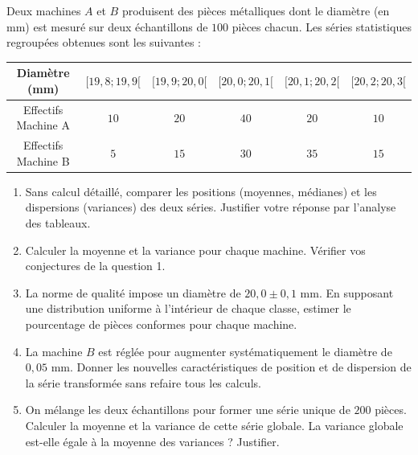 \documentclass[11pt]{article}
\begin{document}
\begin{exercice}
Deux machines $A$ et $B$ produisent des pièces métalliques dont le diamètre (en mm) est mesuré sur deux échantillons de $100$ pièces chacun. Les séries statistiques regroupées obtenues sont les suivantes :

\begin{center}
\begin{tabular}{|c|c|c|c|c|c|}
\hline
Diamètre (mm) & $[19,8; 19,9[$ & $[19,9; 20,0[$ & $[20,0; 20,1[$ & $[20,1; 20,2[$ & $[20,2; 20,3[$ \\
\hline
Effectifs Machine A & $10$ & $20$ & $40$ & $20$ & $10$ \\
\hline
Effectifs Machine B & $5$ & $15$ & $30$ & $35$ & $15$ \\
\hline
\end{tabular}
\end{center}

\begin{enumerate}
    \item Sans calcul détaillé, comparer les positions (moyennes, médianes) et les dispersions (variances) des deux séries. Justifier votre réponse par l'analyse des tableaux.
    \item Calculer la moyenne et la variance pour chaque machine. Vérifier vos conjectures de la question 1.
    \item La norme de qualité impose un diamètre de $20,0 \pm 0,1$ mm. En supposant une distribution uniforme à l'intérieur de chaque classe, estimer le pourcentage de pièces conformes pour chaque machine.
    \item La machine $B$ est réglée pour augmenter systématiquement le diamètre de $0,05$ mm. Donner les nouvelles caractéristiques de position et de dispersion de la série transformée sans refaire tous les calculs.
    \item On mélange les deux échantillons pour former une série unique de $200$ pièces. Calculer la moyenne et la variance de cette série globale. La variance globale est-elle égale à la moyenne des variances ? Justifier.
\end{enumerate}
\end{exercice}
\end{document}
